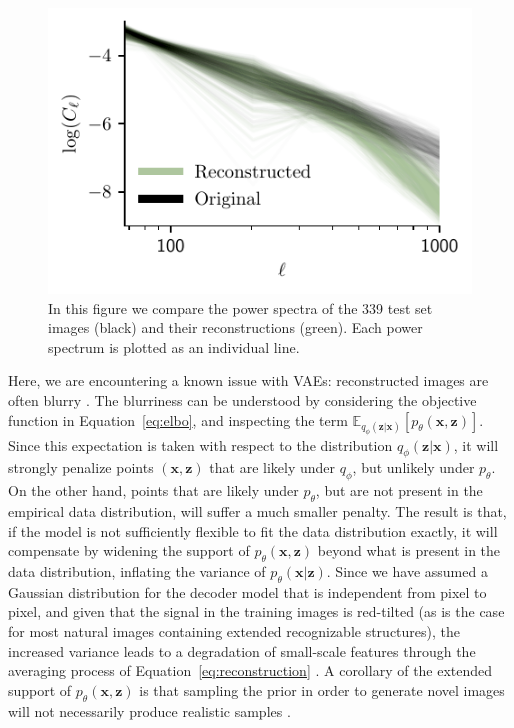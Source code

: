 \documentclass[fleqn,usenatbib]{mnras}
\begin{document}
\begin{figure}
    \centering
    \includegraphics{ ./powerspectrum_distribution.pdf}
    \caption{In this figure we compare the power spectra of the 339 test set images (black) and their reconstructions (green). Each power spectrum is plotted as an individual line.}
    \label{fig:powerspectrum_distribution}
\end{figure}

Here, we are encountering a known issue with VAEs: reconstructed images are often blurry \citep{kingma/dhariwal:2018, kingma/etal:2016, kingma/welling:2019}. The blurriness can be understood by considering the objective function in Equation~\ref{eq:elbo}, and inspecting the term $\mathbb E_{q_\phi(\mathbf z | \mathbf x)}\left[p_\theta(\mathbf x, \mathbf z) \right]$. Since this expectation is taken with respect to the distribution $q_\phi(\mathbf z | \mathbf x)$, it will strongly penalize points $(\mathbf x, \mathbf z)$ that are likely under $q_\phi$, but unlikely under $p_\theta$. On the other hand, points that are likely under $p_\theta$, but are not present in the empirical data distribution, will suffer a much smaller penalty. The result is that, if the model is not sufficiently flexible to fit the data distribution exactly, it will compensate by widening the support of $p_\theta(\mathbf x, \mathbf z)$ beyond what is present in the data distribution, inflating the variance of $p_\theta(\mathbf x | \mathbf z)$. Since we have assumed a Gaussian distribution for the decoder model that is independent from pixel to pixel, and given that the signal in the training images is red-tilted (as is the case for most natural images containing extended recognizable structures), the increased variance leads to a degradation of small-scale features through the averaging process of Equation~\ref{eq:reconstruction} \citep{zhao/etal:2017}. 
A corollary of the extended support of $p_\theta(\mathbf x, \mathbf z)$ is that sampling the prior in order to generate novel images will not necessarily produce realistic samples \citep{kingma/welling:2019}.  
\end{document}
